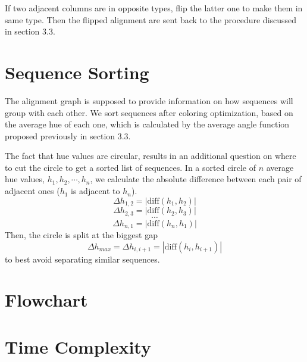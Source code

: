 If two adjacent columns are in opposite types, flip the latter one to make them in same type. Then the flipped alignment are sent back to the procedure discussed in section 3.3.

\section{Sequence Sorting}

The alignment graph is supposed to provide information on how sequences will group with each other. We sort sequences after coloring optimization, based on the average hue of each one, which is calculated by the average angle function proposed previously in section 3.3.

The fact that hue values are circular, results in an additional question on where to cut the circle to get a sorted list of sequences. In a sorted circle of $n$ average hue values, $h_1,h_2,\cdots,h_n$, we calculate the absolute difference between each pair of adjacent ones ($h_1$ is adjacent to $h_n$). $$\Delta h_{1,2}=|\mathrm{diff}(h_1,h_2)|$$ $$\Delta h_{2,3}=|\mathrm{diff}(h_2,h_3)|$$ $$\cdots$$ $$\Delta h_{n,1}=|\mathrm{diff}(h_n,h_1)|$$ Then, the circle is split at the biggest gap $$\Delta h_{max}=\Delta h_{i,i+1}=|\mathrm{diff}(h_i,h_{i+1})|$$ to best avoid separating similar sequences.

\section{Flowchart}

\section{Time Complexity}
